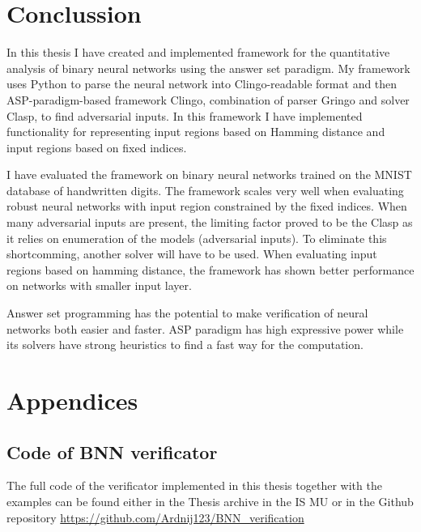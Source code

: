 \documentclass[
    digital,
    color,
    oneside,
    sansbold,
    lot,
    nolof
]{fithesis}
\begin{document}



\chapter{Conclussion}

In this thesis I have created and implemented framework for the quantitative
analysis of binary neural networks using the answer set paradigm. My framework
uses Python to parse the neural network into Clingo-readable format and then
ASP-paradigm-based framework Clingo, combination of parser Gringo and solver
Clasp, to find adversarial inputs. In this framework I have implemented
functionality for representing input regions based on Hamming distance
and input regions based on fixed indices.

I have evaluated the framework on binary neural networks trained on the MNIST
database of handwritten digits. The framework scales very well when evaluating
robust neural networks with input region constrained by the fixed indices.
When many adversarial inputs are present, the limiting factor proved to be
the Clasp as it relies on enumeration of the models (adversarial inputs).
To eliminate this shortcomming, another solver will have to be used.
When evaluating input regions based on hamming distance, the framework has shown
better performance on networks with smaller input layer.

Answer set programming has the potential to make verification of neural networks
both easier and faster. ASP paradigm has high expressive power while
its solvers have strong heuristics to find a fast way for the computation.




\chapter*{Appendices}

\section*{Code of BNN verificator}
The full code of the verificator implemented in this thesis together with
the examples can be found either in the Thesis archive in the IS MU
or in the Github repository \href{https://github.com/Ardnij123/BNN_verification}{https://github.com/Ardnij123/BNN\_verification}
\end{document}

